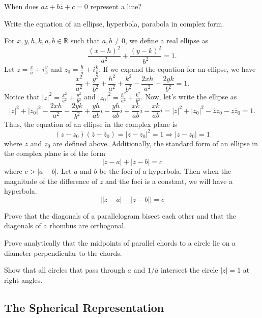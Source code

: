 \begin{exercise}
\item
  When does \(az + b\bar{z} + c = 0\) represent a line?
\item
  Write the equation of an ellipse, hyperbola, parabola in complex form.
  \par\smallskip
  For \(x,y,h,k,a,b\in\mathbb{R}\) such that \(a,b\neq 0\), we define a real
  ellipse as
  \[
  \frac{(x - h)^2}{a^2} + \frac{(y - k)^2}{b^2} = 1.
  \]
  Let \(z = \frac{x}{a} + i\frac{y}{b}\) and
  \(z_0 = \frac{h}{a} + i\frac{k}{b}\).
  If we expand the equation for an ellipse, we have
  \[
  \frac{x^2}{a^2} + \frac{y^2}{b^2} + \frac{h^2}{a^2} + \frac{k^2}{b^2} -
  \frac{2xh}{a^2} - \frac{2yk}{b^2} = 1.
  \]
  Notice that \(\lvert z\rvert^2 = \frac{x^2}{a^2} + \frac{y^2}{b^2}\) and
  \(\lvert z_0\rvert^2 = \frac{h^2}{a^2} + \frac{k^2}{b^2}\).
  Now, let's write the ellipse as
  \[
  \lvert z\rvert^2 + \lvert z_0\rvert^2 - \frac{2xh}{a^2} - \frac{2yk}{b^2} +
  \frac{yh}{ab}i - \frac{yh}{ab}i + \frac{xk}{ab}i - \frac{xk}{ab}i =
  \lvert z\rvert^2 + \lvert z_0\rvert^2 - \bar{z}z_0 - z\bar{z}_0 = 1.
  \]
  Thus, the equation of an ellipse in the complex plane is
  \[
  (z - z_0)(\bar{z} - \bar{z}_0) = \lvert z - z_0\rvert^2 = 1\Rightarrow
  \lvert z - z_0\rvert = 1
  \]
  where \(z\) and \(z_0\) are defined above.
  Additionally, the standard form of an ellipse in the complex plane is of the
  form
  \[
  \lvert z - a\rvert + \lvert z - b\rvert = c
  \]
  where \(c > \lvert a - b\rvert\).
  Let \(a\) and \(b\) be the foci of a hyperbola.
  Then when the magnitude of the difference of \(z\) and the foci is a constant, we will have a hyperbola.
  \[
  \bigl\lvert\lvert z - a\rvert - \lvert z - b\rvert\bigr\rvert = c
  \]
\item
  Prove that the diagonals of a parallelogram bisect each other and that the
  diagonals of a rhombus are orthogonal.
\item
  Prove analytically that the midpoints of parallel chords to a circle lie on a
  diameter perpendicular to the chords.
\item
  Show that all circles that pass through \(a\) and \(1/\bar{a}\) intersect the
  circle \(\lvert z\rvert = 1\) at right angles.
\end{exercise}

\subsection{The Spherical Representation}

